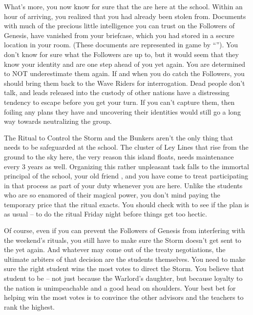 \documentclass[char]{GL2020}
\begin{document}
What's more, you now know for sure that the \pGoaties{} are here at the school. Within an hour of arriving, you realized that you had already been stolen from. Documents with much of the precious little intelligence you can trust on the Followers of Genesis, have vanished from your briefcase, which you had stored in a secure location in your room. (These documents are represented in game by ``\iFolderOfNotes{}''). You don't know for sure what the Followers are up to, but it would seem that they know your identity and are one step ahead of you yet again. You are determined to NOT underestimate them again. If and when you do catch the Followers, you should bring them back to the Wave Riders for interrogation. Dead people don't talk, and leads released into the custody of other nations have a distressing tendency to escape before you get your turn. If you can't capture them, then foiling any plans they have and uncovering their identities would still go a long way towards neutralizing the group.

The Ritual to Control the Storm and the Bunkers aren't the only thing that needs to be safeguarded at the school. The cluster of Ley Lines that rise from the ground to the sky here, the very reason this island floats, needs maintenance every 3 years as well. Organizing this rather unpleasant task falls to the immortal principal of the school, your old friend \cPrincipal{}, and you have come to treat participating in that process as part of your duty whenever you are here. Unlike the students who are so enamored of their magical power, you don't mind paying the temporary price that the ritual exacts. You should check with \cPrincipal{} to see if the plan is as usual -- to do the ritual Friday night before things get too hectic.

Of course, even if you can prevent the Followers of Genesis from interfering with the weekend's rituals, you still have to make sure the Storm doesn't get sent to the \pShip{} yet again. And whatever may come out of the treaty negotiations, the ultimate arbiters of that decision are the students themselves. You need to make sure the right student wins the most votes to direct the Storm. You believe that student to be \cWarlordDaughter{\full} – not just because \cWarlordDaughter{\theyare} the Warlord's daughter, but because \cWarlordDaughter{\their} loyalty to the nation is unimpeachable and \cWarlordDaughter{\they} \cWarlordDaughter{\have} a good head on \cWarlordDaughter{\their} shoulders. Your best bet for helping \cWarlordDaughter{} win the most votes is to convince the other \pShip{} advisors and the \pFarm{} teachers to rank \cWarlordDaughter{\them} the highest.
\end{document}
